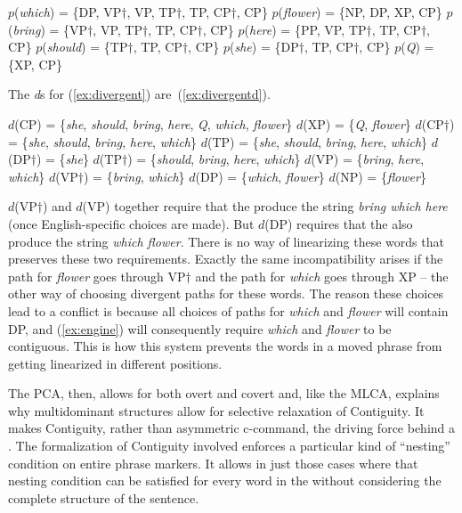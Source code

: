 \documentclass[output=paper]{langsci/langscibook}
\begin{document}
\begin{exe}
	\ex \label{ex:divergent}
	\begin{xlist}
		\ex $p$(\emph{which}) = \{DP, VP$\dag$, VP, TP$\dag$, TP, CP$\dag$, CP\}
		\ex $p$(\emph{flower}) = \{NP, DP, XP, CP\}
		\ex $p$(\emph{bring}) = \{VP$\dag$, VP, TP$\dag$, TP, CP$\dag$, CP\}
		\ex $p$(\emph{here}) = \{PP, VP, TP$\dag$, TP, CP$\dag$, CP\}
		\ex $p$(\emph{should}) = \{TP$\dag$, TP, CP$\dag$, CP\}
		\ex $p$(\emph{she}) = \{DP$\dag$, TP, CP$\dag$, CP\}
		\ex $p$(\emph{Q}) = \{XP, CP\}
	\end{xlist}
\end{exe}
The \emph{d}s for (\ref{ex:divergent}) are~(\ref{ex:divergentd}).
\begin{exe}
	\ex \label{ex:divergentd}
	\begin{xlist}
		\ex $d$(CP) = \{\emph{she}, \emph{should}, \emph{bring}, \emph{here}, \emph{Q}, \emph{which}, \emph{flower}\}
		\ex $d$(XP) = \{\emph{Q}, \emph{flower}\}
		\ex $d$(CP$\dag$) = \{\emph{she}, \emph{should}, \emph{bring}, \emph{here}, \emph{which}\}
		\ex $d$(TP) = \{\emph{she}, \emph{should}, \emph{bring}, \emph{here}, \emph{which}\}
		\ex $d$(DP$\dag$) = \{\emph{she}\}
		\ex $d$(TP$\dag$) = \{\emph{should}, \emph{bring}, \emph{here}, \emph{which}\}
		\ex $d$(VP) = \{\emph{bring}, \emph{here}, \emph{which}\}
		\ex $d$(VP$\dag$) = \{\emph{bring}, \emph{which}\}
		\ex $d$(DP) = \{\emph{which}, \emph{flower}\}
		\ex $d$(NP) = \{\emph{flower}\}
	\end{xlist}
\end{exe}

$d$(VP$\dag$) and $d$(VP) together require that the  produce the
string \emph{bring which here} (once English-specific choices are made). But
$d$(DP) requires that the  also produce the string \emph{which
flower}. There is no way of linearizing these words that preserves these two
requirements. Exactly the same incompatibility arises if the path for
\emph{flower} goes through VP$\dag$ and the path for \emph{which} goes through
XP -- the other way of choosing divergent paths for these words. The reason
these choices lead to a conflict is because all choices of paths for
\emph{which} and \emph{flower} will contain DP, and (\ref{ex:engine}) will
consequently require \emph{which} and \emph{flower} to be contiguous. This is
how this system prevents the words in a moved phrase from getting linearized in
different positions.

The \gls{PCA}, then, allows for both overt and covert  and, like the
\gls{MLCA}, explains why multidominant structures allow for selective
relaxation of Contiguity. It makes Contiguity, rather than asymmetric
c-command, the driving force behind a . The formalization of
Contiguity involved enforces a particular kind of ``nesting'' condition on
entire phrase markers. It allows  in just those cases where that
nesting condition can be satisfied for every word in the  without
considering the complete structure of the sentence.
\end{document}
